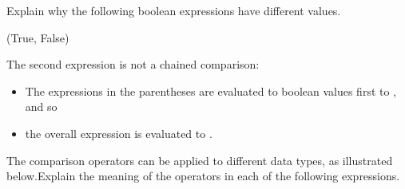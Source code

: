 \documentclass[letterpaper,10pt,english]{sphinxmanual}
\begin{document}
 Explain why the following boolean expressions have different values.

\begin{sphinxVerbatim}[commandchars=\\\{\}]
             
\end{sphinxVerbatim}

\begin{sphinxVerbatim}[commandchars=\\\{\}]
(True, False)
\end{sphinxVerbatim}

The second expression is not a chained comparison:
\begin{itemize}
\item {} 
The expressions in the parentheses are evaluated to boolean values first to , and so

\item {} 
the overall expression  is evaluated to .

\end{itemize}

 The comparison operators can be applied to different data types, as illustrated below.Explain the meaning of the operators in each of the following expressions.
\end{document}
